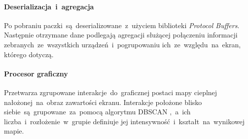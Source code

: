 \paragraph{Deserializacja~i~agregacja}
Po pobraniu paczki~są~deserializowane~z~użyciem biblioteki {\it Protocol Buffers}. Następnie otrzymane dane podlegają agregacji służącej połączeniu informacji zebranych~ze~wszystkich urządzeń~i~pogrupowaniu ich~ze~względu~na~ekran, którego dotyczą.

\paragraph{Procesor graficzny} 
\label{par:rs_graphical_processor}
Przetwarza zgrupowane interakcje~do~graficznej postaci mapy cieplnej nałożonej~na~obraz zawartości ekranu. Interakcje położone blisko siebie~są~grupowane~za~pomocą algorytmu DBSCAN \cite{DBSCAN_Wiki},~a~ich liczba~i~rozłożenie~w~grupie definiuje jej intensywność~i~kształt~na~wynikowej mapie.
